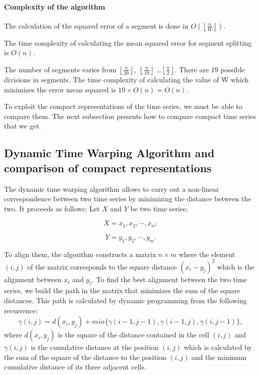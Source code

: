  

\paragraph{Complexity of the algorithm}
The calculation of the squared error of a segment is done in $ O(\left \lfloor
\frac{n}{W} \right \rfloor) $.

The time complexity of calculating the mean squared error for segment splitting is
$ O(n). $


The number of segments varies from $ \left \lfloor \frac{n}{20} \right \rfloor, \; \left \lfloor \frac{n}{19} \right \rfloor $ \ldots $ \left \lfloor \frac{n}{2} \right \rfloor $. There are 19 possible divisions in segments. The time complexity of calculating the value of W which minimizes the error
mean squared is $ 19 \times O(n) = O(n) $.


To exploit the compact representations of the time series, we must be able to compare them. The next subsection presents how to compare compact time series that we get.

\subsection{Dynamic Time Warping Algorithm and comparison of compact representations}

The dynamic time warping algorithm \cite{Keogh2004} allows to carry out a non-linear correspondence between two time series by minimizing the distance between the two. It proceeds as follows:
Let $X$ and $Y$ be two time series;

\[
X=x_{1},x_{2},\cdots,x_{n};
\]


\[
Y=y_{1},y_{2},\cdots,y_{m}.
\]

 To align them, the algorithm constructs a matrix $ n \times m $ where
the element $ (i, j) $ of the matrix corresponds to the square distance $ (x_{i} - y_{j}) ^ {2} $ which
is the alignment between $ x_{i} $ and $ y_{j} $. To find the best alignment between the two time series, we build
the path in the matrix that minimizes the sum of the square distances. This path is calculated by
dynamic programming from the following recurrence:
\[
\gamma(i, j) = d (x_{i}, y_{j}) + min \{\gamma(i-1, j-1), \gamma(i-1, j), \gamma(i , j-1) \},
\]
where $ d(x_{i}, y_{j}) $ is the square of the distance contained in the cell $ (i, j) $ and $ \gamma(i, j) $ is the
cumulative distance at the position $ (i, j) $ which is calculated by the sum of the square of the distance to
the position $ (i, j) $ and the minimum cumulative distance of its three adjacent cells.


